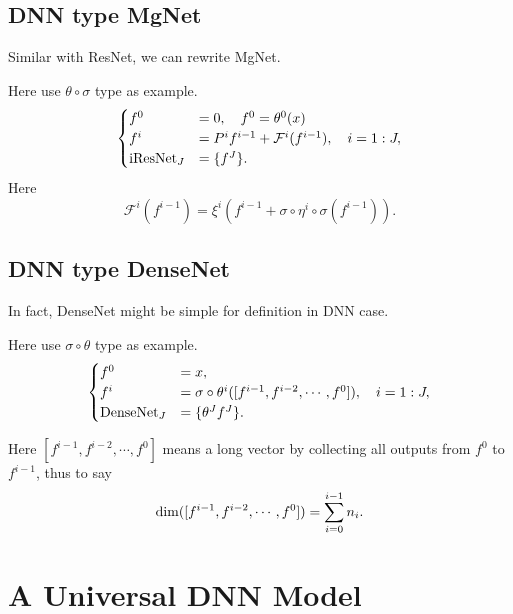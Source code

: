 \subsection{DNN type MgNet}
Similar with ResNet, we can rewrite MgNet.

Here use $\theta \circ \sigma$ type as example.
\begin{equation}\label{ori-MgNetNet-dnn}
\begin{cases}
f^0 &= 0, \quad f^0 = \theta^0(x) \\
f^{i} &=  P^i f^{i-1} + \mathcal{F}^{ i} (f^{i-1}) , \quad i = 1:J ,\\
{\rm iResNet}_{J} &= \{  f^{J} \}.
\end{cases}
\end{equation}
Here
\begin{equation}\label{eq:F-MgNet}
\mathcal{F}^{i} (f^{i-1}) = \xi^{i} \left( f^{i-1} +  \sigma \circ \eta^{i} \circ \sigma(f^{i-1}) \right).
\end{equation}

\subsection{DNN type DenseNet}
In fact, DenseNet might be simple for definition in DNN case. 

Here use $\sigma \circ \theta$ type as example.
\begin{equation}\label{ori-DenseNet-dnn}
\begin{cases}
f^0 &= x, \\
f^{i} &=   \sigma \circ \theta^{i}([f^{i-1}, f^{i-2}, \cdots, f^0]) , \quad i = 1:J ,\\
{\rm DenseNet}_{J} &= \{  \theta^J f^{J} \}.
\end{cases}
\end{equation}

Here $[f^{i-1}, f^{i-2}, \cdots, f^0]$ means a long vector by collecting all 
outputs from $f^0$ to $f^{i-1}$, thus to say
$$
{\rm dim}([f^{i-1}, f^{i-2}, \cdots, f^0]) = \sum_{i=0}^{i-1} n_i.
$$


\section{A Universal DNN Model}

